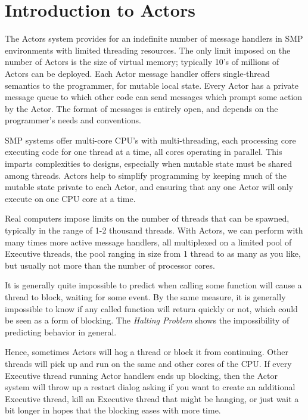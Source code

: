 \documentclass[article,oneside]{memoir}
\begin{document}

\chapter{Introduction to Actors}

The Actors system provides for an indefinite number of message handlers in SMP environments with limited threading resources. The only limit imposed on the number of Actors is the size of virtual memory; typically 10's of millions of Actors can be deployed. Each Actor message handler offers single-thread semantics to the programmer, for mutable local state. Every Actor has a private message queue to which other code can send messages which prompt some action by the Actor. The format of messages is entirely open, and depends on the programmer's needs and conventions.

SMP systems offer multi-core CPU's with multi-threading, each processing core executing code for one thread at a time, all cores operating in parallel. This imparts complexities to designs, especially when mutable state must be shared among threads. Actors help to simplify programming by keeping much of the mutable state private to each Actor, and ensuring that any one Actor will only execute on one CPU core at a time.

Real computers impose limits on the number of threads that can be spawned, typically in the range of 1-2 thousand threads. With Actors, we can perform with many times more active message handlers, all multiplexed on a limited pool of Executive threads, the pool ranging in size from 1 thread to as many as you like, but usually not more than the number of processor cores.

It is generally quite impossible to predict when calling some function will cause a thread to block, waiting for some event. By the same measure, it is generally impossible to know if any called function will return quickly or not, which could be seen as a form of blocking. The \textit{Halting Problem} shows the impossibility of predicting behavior in general. 

Hence, sometimes Actors will hog a thread or block it from continuing. Other threads will pick up and run on the same and other cores of the CPU. If every Executive thread running Actor handlers ends up blocking, then the Actor system will throw up a restart dialog asking if you want to create an additional Executive thread, kill an Executive thread that might be hanging, or just wait a bit longer in hopes that the blocking eases with more time.
\end{document}

